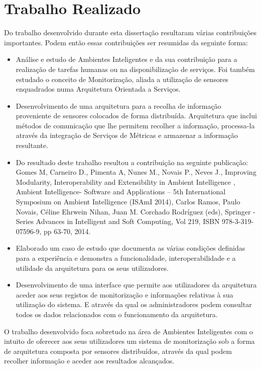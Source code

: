 \section{Trabalho Realizado}

Do trabalho desenvolvido durante esta dissertação resultaram várias contribuições importantes. Podem então essas contribuições ser resumidas da seguinte forma:

\begin{itemize}
	\item Análise e estudo de Ambientes Inteligentes e da sua contribuição para a realização de tarefas humanas ou na disponibilização de serviços. Foi também estudado o conceito de Monitorização, aliada a utilização de sensores enquadrados numa Arquitetura Orientada a Serviços.
	\item Desenvolvimento de uma arquitetura para a recolha de informação proveniente de sensores colocados de forma distribuída. Arquitetura que inclui métodos de comunicação que lhe permitem recolher a informação, processa-la através da integração de Serviços de Métricas e armazenar a informação resultante.
	\item Do resultado deste trabalho resultou a contribuição na seguinte publicação: Gomes M, Carneiro D., Pimenta A, Nunes M., Novais P., Neves J., Improving Modularity, Interoperability and Extensibility in Ambient Intelligence , Ambient Intelligence- Software and Applications – 5th International Symposium on Ambient Intelligence (ISAmI 2014), Carlos Ramos, Paulo Novais, Céline Ehrwein Nihan, Juan M. Corchado Rodríguez (eds), Springer - Series Advances in Intelligent and Soft Computing, Vol 219, ISBN 978-3-319-07596-9, pp 63-70, 2014.
	\item Elaborado um caso de estudo que documenta as várias condições definidas para a experiência e demonstra a funcionalidade, interoperabilidade e a utilidade da arquitetura para os seus utilizadores.
	\item Desenvolvimento de uma interface que permite aos utilizadores da arquitetura aceder aos seus registos de monitorização e informações relativas à sua utilização do sistema. E através da qual os administradores podem consultar todos os dados relacionados com o funcionamento da arquitetura.

\end{itemize}

O trabalho desenvolvido foca sobretudo na área de Ambientes Inteligentes com o intuito de oferecer aos seus utilizadores um sistema de monitorização sob a forma de arquitetura composta por sensores distribuídos, através da qual podem recolher informação e aceder aos resultados alcançados.


